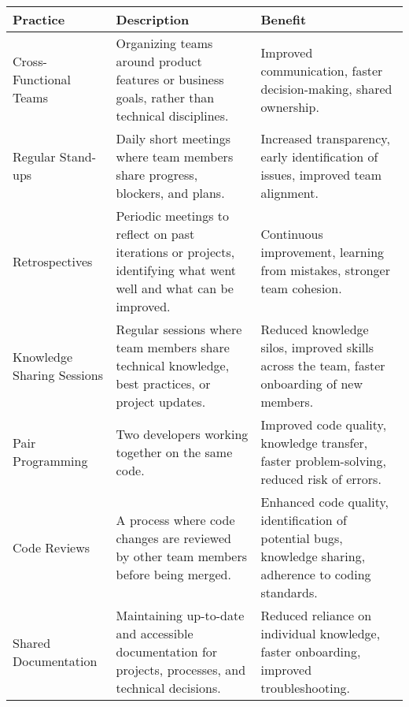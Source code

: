 \begin{longtable}{|p{4cm}|p{5cm}|p{4cm}|}
    \hline
    \textbf{Practice}               & \textbf{Description}                                                                                                             & \textbf{Benefit}                                                                                           \\
    \hline
    Cross-Functional Teams          & Organizing teams around product features or business goals, rather than technical disciplines.                                   & Improved communication, faster decision-making, shared ownership.                                          \\
    \hline
    Regular Stand-ups               & Daily short meetings where team members share progress, blockers, and plans.                                                     & Increased transparency, early identification of issues, improved team alignment.                           \\
    \hline
    Retrospectives                  & Periodic meetings to reflect on past iterations or projects, identifying what went well and what can be improved.                & Continuous improvement, learning from mistakes, stronger team cohesion.                                    \\
    \hline
    Knowledge Sharing Sessions      & Regular sessions where team members share technical knowledge, best practices, or project updates.                               & Reduced knowledge silos, improved skills across the team, faster onboarding of new members.                \\
    \hline
    Pair Programming                & Two developers working together on the same code.                                                                                & Improved code quality, knowledge transfer, faster problem-solving, reduced risk of errors.                 \\
    \hline
    Code Reviews                    & A process where code changes are reviewed by other team members before being merged.                                             & Enhanced code quality, identification of potential bugs, knowledge sharing, adherence to coding standards. \\
    \hline
    Shared Documentation            & Maintaining up-to-date and accessible documentation for projects, processes, and technical decisions.                            & Reduced reliance on individual knowledge, faster onboarding, improved troubleshooting.                     \\

\end{longtable}
